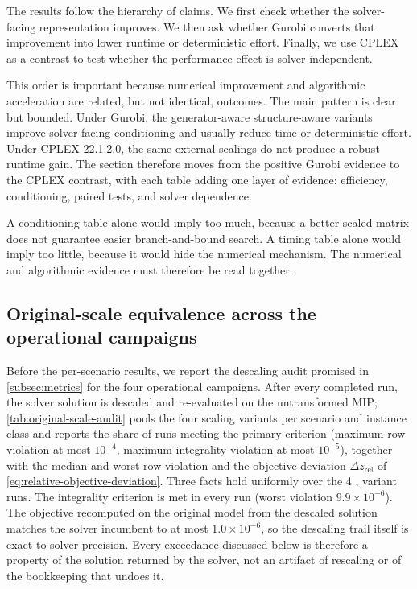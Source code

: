 \documentclass[AMA,Times1COL]{WileyNJDv5} %
\providecommand{\DIFadd}[1]{{\protect\color{blue} \sf #1}} %
\providecommand{\DIFdel}[1]{{\protect\color{red} \scriptsize #1}} %
\providecommand{\DIFaddbegin}{} %
\providecommand{\DIFaddend}{} %
\providecommand{\DIFdelbegin}{} %
\providecommand{\DIFdelend}{} %
\begin{document}
The results follow the hierarchy of claims. We first check whether the solver-facing representation improves. We then ask whether Gurobi converts that improvement into lower runtime or deterministic effort. Finally, we use CPLEX as a contrast to test whether the performance effect is solver-independent.

This order is important because numerical improvement and algorithmic acceleration are related, but not identical, outcomes. The main pattern is clear but bounded. Under Gurobi, the \DIFdelbegin \DIFdel{generator-aware }\DIFdelend \DIFaddbegin \DIFadd{structure-aware }\DIFaddend variants improve solver-facing conditioning and usually reduce time or deterministic effort. Under CPLEX 22.1.2.0, the same external scalings do not produce a robust runtime gain. The section therefore moves from the positive Gurobi evidence to the CPLEX contrast, with each table adding one layer of evidence: efficiency, conditioning, paired tests, and solver dependence.

A conditioning table alone would imply too much, because a better-scaled matrix does not
guarantee easier branch-and-bound search. A timing table alone would imply too little,
because it would hide the numerical mechanism. The numerical and algorithmic evidence
must therefore be read together.

\DIFaddbegin \subsection{\DIFadd{Original-scale equivalence across the operational campaigns}}
\label{subsec:original-scale-audit}

\DIFadd{Before the per-scenario results, we report the descaling audit promised in
\cref{subsec:metrics} for the four operational campaigns. After every completed run, the
solver solution is descaled and re-evaluated on the untransformed MIP;
\cref{tab:original-scale-audit} pools the four scaling variants per scenario and instance
class and reports the share of runs meeting the primary criterion (maximum row violation
at most $10^{-4}$, maximum integrality violation at most $10^{-5}$), together with the
median and worst row violation and the objective deviation $\Delta z_{\mathrm{rel}}$ of
\cref{eq:relative-objective-deviation}. Three facts hold uniformly over the 4}{\DIFadd{,}}\DIFadd{806
variant runs. The integrality criterion is met in every run (worst violation
$9.9\times10^{-6}$). The objective recomputed on the original model from the descaled
solution matches the solver incumbent to at most $1.0\times10^{-6}$, so the descaling
trail itself is exact to solver precision. Every exceedance discussed below is therefore
a property of the solution returned by the solver, not an artifact of rescaling or of
the bookkeeping that undoes it.
}
\end{document}
